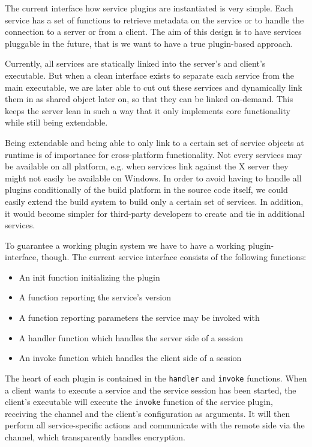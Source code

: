 The current interface how service plugins are instantiated is very simple.
Each service has a set of functions to retrieve metadata on the service or to handle the connection to a server or from a client.
The aim of this design is to have services pluggable in the future, that is we want to have a true plugin-based approach.

Currently, all services are statically linked into the server's and client's executable.
But when a clean interface exists to separate each service from the main executable, we are later able to cut out these services and dynamically link them in as shared object later on, so that they can be linked on-demand.
This keeps the server lean in such a way that it only implements core functionality while still being extendable.

Being extendable and being able to only link to a certain set of service objects at runtime is of importance for cross-platform functionality.
Not every services may be available on all platform, e.g. when services link against the X server they might not easily be available on Windows.
In order to avoid having to handle all plugins conditionally of the build platform in the source code itself, we could easily extend the build system to build only a certain set of services.
In addition, it would become simpler for third-party developers to create and tie in additional services.

\medskip

To guarantee a working plugin system we have to have a working plugin-interface, though.
The current service interface consists of the following functions:
\begin{itemize}
    \item An init function initializing the plugin
    \item A function reporting the service's version
    \item A function reporting parameters the service may be invoked with
    \item A handler function which handles the server side of a session
    \item An invoke function which handles the client side of a session
\end{itemize}

The heart of each plugin is contained in the \lstinline{handler} and \lstinline{invoke} functions.
When a client wants to execute a service and the service session has been started, the client's executable will execute the \lstinline{invoke} function of the service plugin, receiving the channel and the client's configuration as arguments.
It will then perform all service-specific actions and communicate with the remote side via the channel, which transparently handles encryption.


